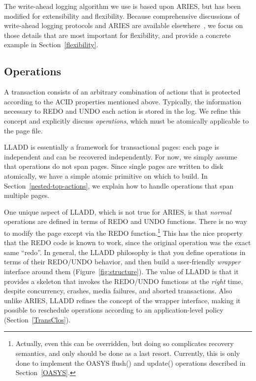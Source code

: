 \documentclass[10pt,letterpaper,twocolumn,english]{article}
\newcommand{\yad}{LLADD\xspace}
\newcommand{\oasys}{OASYS\xspace}
\begin{document}
The write-ahead logging algorithm we use is based upon ARIES, but has been
modified for extensibility and flexibility. Because comprehensive
discussions of write-ahead logging protocols and ARIES are available
elsewhere~\cite{haerder, aries}, we focus on those details that are
most important for flexibility, and provide a concrete example in Section~\ref{flexibility}.


\subsection{Operations}
\label{sub:OperationProperties}

A transaction consists of an arbitrary combination of actions that
is protected according to the ACID properties mentioned above.
Typically, the
information necessary to REDO and UNDO each action is stored in the
log.  We refine this concept and explicitly discuss {\em operations},
which must be atomically applicable to the page file.  

\yad is essentially a framework for transactional pages: each page is
independent and can be recovered independently. For now, we simply
assume that operations do not span pages.  Since single pages are
written to disk atomically, we have a simple atomic primitive on which
to build. In Section~\ref{nested-top-actions}, we explain how to
handle operations that span multiple pages.

One unique aspect of \yad, which is not true for ARIES, is that {\em
normal} operations are defined in terms of REDO and UNDO
functions. There is no way to modify the page except via the REDO
function.\footnote{Actually, even this can be overridden, but doing so
complicates recovery semantics, and only should be done as a last
resort.  Currently, this is only done to implement the \oasys flush()
and update() operations described in Section~\ref{OASYS}.}  This has
the nice property that the REDO code is known to work, since the
original operation was the exact same ``redo''.  In general, the \yad
philosophy is that you define operations in terms of their REDO/UNDO
behavior, and then build a user-friendly {\em wrapper} interface
around them (Figure~\ref{fig:structure}).  The value of \yad is that it provides a skeleton that
invokes the REDO/UNDO functions at the {\em right} time, despite
concurrency, crashes, media failures, and aborted transactions.  Also
unlike ARIES, \yad refines the concept of the wrapper interface,
making it possible to reschedule operations according to an
application-level policy (Section~\ref{TransClos}).
\end{document}

